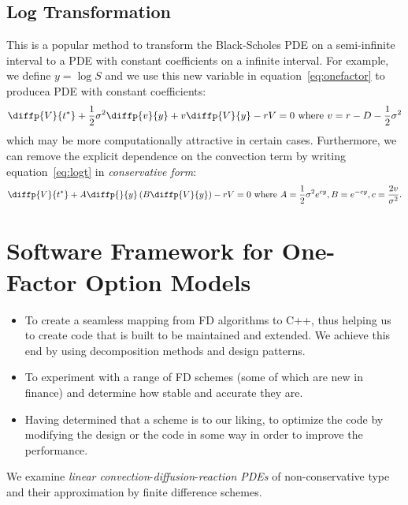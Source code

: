 \subsection{Log Transformation}
\begin{frame}[t]{\subsecname}
This is a popular method to transform the Black-Scholes PDE on a semi-infinite interval to a PDE with constant coefficients on a infinite interval. For example, we define $y=\log S$ and we use this new variable in equation~\eqref{eq:onefactor} to producea PDE with constant coefficients:
\begin{equation}\label{eq:logt}
\diffp{V}{t^{\ast}}+\frac{1}{2}\sigma^{2}\diffp{v}{y}+v\diffp{V}{y}-rV=0\text{ where } v=r-D-\frac{1}{2}\sigma^{2}
\end{equation}
which may be more computationally attractive in certain cases. Furthermore, we can remove the explicit dependence on the convection term by writing equation~\eqref{eq:logt} in \emph{conservative form}:
\begin{equation}
\diffp{V}{t^{\ast}}+A\diffp{}{y}\left(B\diffp{V}{y}\right)-rV=0\text{ where }A=\frac{1}{2}\sigma^{2}e^{cy}, B=e^{-cy},c=\frac{2v}{\sigma^{2}}.
\end{equation}
\end{frame}

\section{Software Framework for One-Factor Option Models}

\begin{frame}[t]{\secname}
\begin{itemize}
	\item To create a seamless mapping from FD algorithms to C++, thus helping us to create code that is built to be maintained and extended. We achieve this end by using decomposition methods and design patterns.
	\item To experiment with a range of FD schemes (some of which are new in finance) and determine how stable and accurate they are.
	\item Having determined that a scheme is to our liking, to optimize the code by modifying the design or the code in some way  in order to improve the performance.
\end{itemize}

We examine \emph{linear convection}-\emph{diffusion}-\emph{reaction PDEs} of non-conservative type and their approximation by finite difference schemes.

\end{frame}

